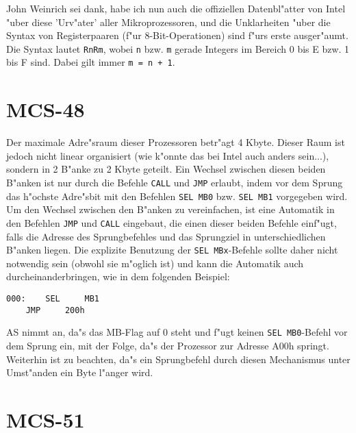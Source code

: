 \documentclass[12pt,a4paper,twoside]{report}
\newcommand{\tty}[1]{{\tt #1}}
\begin{document}
{John Weinrich sei dank, habe ich nun auch die offiziellen Datenbl"atter
von Intel "uber diese 'Urv"ater' aller Mikroprozessoren, und die
Unklarheiten "uber die Syntax von Registerpaaren (f"ur 8-Bit-Operationen)
sind f"urs erste ausger"aumt.  Die Syntax lautet \tty{RnRm}, wobei \tty{n}
bzw. \tty{m} gerade Integers im Bereich 0 bis E bzw. 1 bis F sind.  Dabei
gilt immer \tty{m = n + 1}.


\section{MCS-48}

Der maximale Adre"sraum dieser Prozessoren betr"agt 4 Kbyte.  Dieser Raum
ist jedoch nicht linear organisiert (wie k"onnte das bei Intel auch anders
sein...), sondern in 2 B"anke zu 2 Kbyte geteilt.  Ein Wechsel zwischen
diesen beiden B"anken ist nur durch die Befehle \tty{CALL} und \tty{JMP}
erlaubt, indem vor dem Sprung das h"ochste Adre"sbit mit den Befehlen
\tty{SEL MB0} bzw. \tty{SEL MB1} vorgegeben wird.
Um den Wechsel zwischen den B"anken zu vereinfachen, ist
eine Automatik in den Befehlen \tty{JMP} und \tty{CALL} eingebaut, die einen dieser
beiden Befehle einf"ugt, falls die Adresse des Sprungbefehles und das
Sprungziel in unterschiedlichen B"anken liegen.  Die explizite Benutzung der
\tty{SEL MBx}-Befehle sollte daher nicht notwendig sein (obwohl sie m"oglich
ist) und kann die Automatik auch durcheinanderbringen, wie in dem folgenden
Beispiel:
\begin{verbatim}
000:    SEL     MB1
	JMP     200h
\end{verbatim}
AS nimmt an, da"s das MB-Flag auf 0 steht und f"ugt keinen
\tty{SEL MB0}-Befehl vor dem Sprung ein, mit der Folge, da"s der
Prozessor zur Adresse A00h springt.
Weiterhin ist zu beachten, da"s ein Sprungbefehl durch diesen Mechanismus
unter Umst"anden ein Byte l"anger wird.


\section{MCS-51}

}
\end{document}
